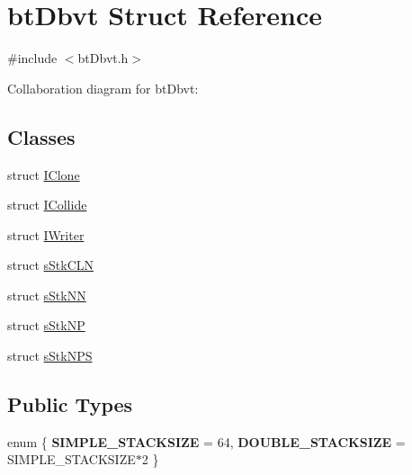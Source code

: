 \hypertarget{structbt_dbvt}{\section{bt\+Dbvt Struct Reference}
\label{structbt_dbvt}
}


{\ttfamily \#include $<$bt\+Dbvt.\+h$>$}



Collaboration diagram for bt\+Dbvt\+:
\subsection*{Classes}
\begin{DoxyCompactItemize}
\item 
struct \hyperlink{structbt_dbvt_1_1_i_clone}{I\+Clone}
\item 
struct \hyperlink{structbt_dbvt_1_1_i_collide}{I\+Collide}
\item 
struct \hyperlink{structbt_dbvt_1_1_i_writer}{I\+Writer}
\item 
struct \hyperlink{structbt_dbvt_1_1s_stk_c_l_n}{s\+Stk\+C\+L\+N}
\item 
struct \hyperlink{structbt_dbvt_1_1s_stk_n_n}{s\+Stk\+N\+N}
\item 
struct \hyperlink{structbt_dbvt_1_1s_stk_n_p}{s\+Stk\+N\+P}
\item 
struct \hyperlink{structbt_dbvt_1_1s_stk_n_p_s}{s\+Stk\+N\+P\+S}
\end{DoxyCompactItemize}
\subsection*{Public Types}
\begin{DoxyCompactItemize}
\item 
\hypertarget{structbt_dbvt_aeddb9223432d2e067a0f6774db56f7fb}{enum \{ {\bfseries S\+I\+M\+P\+L\+E\+\_\+\+S\+T\+A\+C\+K\+S\+I\+Z\+E} = 64, 
{\bfseries D\+O\+U\+B\+L\+E\+\_\+\+S\+T\+A\+C\+K\+S\+I\+Z\+E} = S\+I\+M\+P\+L\+E\+\_\+\+S\+T\+A\+C\+K\+S\+I\+Z\+E$\ast$2
 \}}\label{structbt_dbvt_aeddb9223432d2e067a0f6774db56f7fb}

\end{DoxyCompactItemize}
